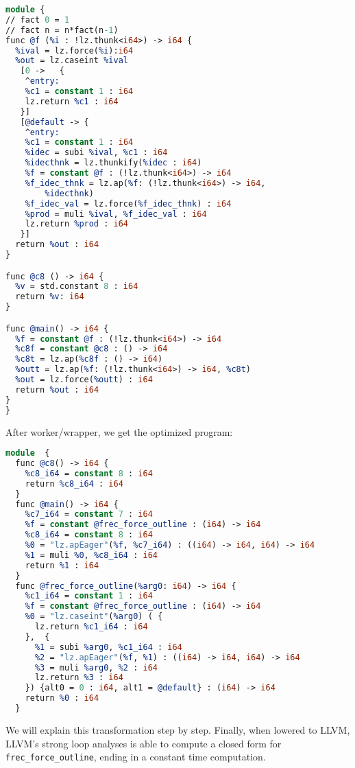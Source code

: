 \documentclass[sigplan,\review anonymous]{acmart}
\begin{document}
{\begin{lstlisting}[language=llvm,caption="Original program with wrapper and laziness overhead"]
module {
// fact 0 = 1
// fact n = n*fact(n-1)
func @f (%i : !lz.thunk<i64>) -> i64 {
  %ival = lz.force(%i):i64
  %out = lz.caseint %ival 
   [0 ->   { 
    ^entry:
    %c1 = constant 1 : i64
    lz.return %c1 : i64
   }]
   [@default -> {
    ^entry:
    %c1 = constant 1 : i64
    %idec = subi %ival, %c1 : i64
    %idecthnk = lz.thunkify(%idec : i64) 
    %f = constant @f : (!lz.thunk<i64>) -> i64
    %f_idec_thnk = lz.ap(%f: (!lz.thunk<i64>) -> i64, 
        %idecthnk)
    %f_idec_val = lz.force(%f_idec_thnk) : i64
    %prod = muli %ival, %f_idec_val : i64
    lz.return %prod : i64
   }]
  return %out : i64
}

func @c8 () -> i64 {
  %v = std.constant 8 : i64
  return %v: i64
}

func @main() -> i64 {
  %f = constant @f : (!lz.thunk<i64>) -> i64
  %c8f = constant @c8 : () -> i64
  %c8t = lz.ap(%c8f : () -> i64)
  %outt = lz.ap(%f: (!lz.thunk<i64>) -> i64, %c8t)
  %out = lz.force(%outt) : i64
  return %out : i64
}
}

\end{lstlisting}

After worker/wrapper, we get the optimized program:

\begin{lstlisting}[language=llvm,caption="factorial that has been worker/wrapper'd"]
module  {
  func @c8() -> i64 {
    %c8_i64 = constant 8 : i64
    return %c8_i64 : i64
  }
  func @main() -> i64 {
    %c7_i64 = constant 7 : i64
    %f = constant @frec_force_outline : (i64) -> i64
    %c8_i64 = constant 8 : i64
    %0 = "lz.apEager"(%f, %c7_i64) : ((i64) -> i64, i64) -> i64
    %1 = muli %0, %c8_i64 : i64
    return %1 : i64
  }
  func @frec_force_outline(%arg0: i64) -> i64 {
    %c1_i64 = constant 1 : i64
    %f = constant @frec_force_outline : (i64) -> i64
    %0 = "lz.caseint"(%arg0) ( {
      lz.return %c1_i64 : i64
    },  {
      %1 = subi %arg0, %c1_i64 : i64
      %2 = "lz.apEager"(%f, %1) : ((i64) -> i64, i64) -> i64
      %3 = muli %arg0, %2 : i64
      lz.return %3 : i64
    }) {alt0 = 0 : i64, alt1 = @default} : (i64) -> i64
    return %0 : i64
  }
\end{lstlisting}

We will explain this transformation step by step. Finally, when lowered to
LLVM, LLVM's strong loop analyses is able to compute a closed form for 
\texttt{frec\_force\_outline}, ending in a constant time computation.

}
\end{document}
